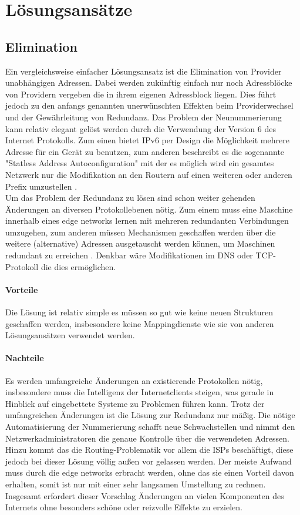 \section{Lösungsansätze}
\subsection{Elimination}
Ein vergleichsweise einfacher Lösungsansatz ist die Elimination von Provider unabhängigen Adressen. Dabei werden zukünftig einfach nur noch Adressblöcke von Providern vergeben die in ihrem eigenen Adressblock liegen. Dies führt jedoch zu den anfangs genannten unerwünschten Effekten beim Providerwechsel und der Gewährleitung von Redundanz. Das Problem der Neunummerierung kann relativ elegant gelöst werden durch die Verwendung der Version 6 des Internet Protokolls. Zum einen bietet IPv6 per Design die Möglichkeit mehrere Adresse für ein Gerät zu benutzen, zum anderen beschreibt es die sogenannte "Statless Address Autoconfiguration" mit der es möglich wird ein gesamtes Netzwerk nur die Modifikation an den Routern auf einen weiteren oder anderen Prefix umzustellen \cite{Stockebrand:2006:IPv6}. \\ Um das Problem der Redundanz zu lösen sind schon weiter gehenden Änderungen an diversen Protokollebenen nötig. Zum einem muss eine Maschine innerhalb eines edge networks lernen mit mehreren redundanten Verbindungen umzugehen, zum anderen müssen Mechanismen geschaffen werden über die weitere (alternative) Adressen ausgetauscht werden können, um Maschinen redundant zu erreichen \cite{jen:2008:start}. Denkbar wäre Modifikationen im DNS oder TCP-Protokoll die dies ermöglichen. \\
\paragraph{Vorteile}
Die Lösung ist relativ simple es müssen so gut wie keine neuen Strukturen geschaffen werden, insbesondere keine Mappingdienste wie sie von anderen Lösungsansätzen verwendet werden. 
\paragraph{Nachteile}
Es werden umfangreiche Änderungen an existierende Protokollen nötig, insbesondere muss die Intelligenz der Internetclients steigen, was gerade in Hinblick auf eingebettete Systeme zu Problemen führen kann. Trotz der umfangreichen Änderungen ist die Lösung zur Redundanz nur mäßig. Die nötige Automatisierung der Nummerierung schafft neue Schwachstellen und nimmt den Netzwerkadministratoren die genaue Kontrolle über die verwendeten Adressen. Hinzu kommt das die Routing-Problematik vor allem die ISPs beschäftigt, diese jedoch bei dieser Lösung völlig außen vor gelassen werden. Der meiste Aufwand muss durch die edge networks erbracht werden, ohne das sie einen Vorteil davon erhalten, somit ist nur mit einer sehr langsamen Umstellung zu rechnen. Insgesamt erfordert dieser Vorschlag Änderungen an vielen Komponenten des Internets ohne besonders schöne oder reizvolle Effekte zu erzielen.


